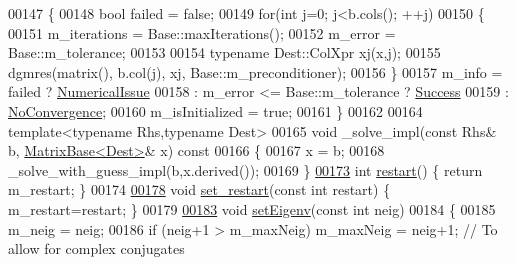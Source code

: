 \begin{DoxyCode}
00147 \textcolor{keyword}{  }\{    
00148     \textcolor{keywordtype}{bool} failed = \textcolor{keyword}{false};
00149     \textcolor{keywordflow}{for}(\textcolor{keywordtype}{int} j=0; j<b.cols(); ++j)
00150     \{
00151       m\_iterations = Base::maxIterations();
00152       m\_error = Base::m\_tolerance;
00153       
00154       \textcolor{keyword}{typename} Dest::ColXpr xj(x,j);
00155       dgmres(matrix(), b.col(j), xj, Base::m\_preconditioner);
00156     \}
00157     m\_info = failed ? \hyperlink{group__enums_gga85fad7b87587764e5cf6b513a9e0ee5eaaf9b736d310a664e7729d163a035cc5f}{NumericalIssue}
00158            : m\_error <= Base::m\_tolerance ? \hyperlink{group__enums_gga85fad7b87587764e5cf6b513a9e0ee5ea52581b035f4b59c203b8ff999ef5fcea}{Success}
00159            : \hyperlink{group__enums_gga85fad7b87587764e5cf6b513a9e0ee5eaba1c8763d1179778070f365ecc4157a8}{NoConvergence};
00160     m\_isInitialized = \textcolor{keyword}{true};
00161   \}
00162 
00164   \textcolor{keyword}{template}<\textcolor{keyword}{typename} Rhs,\textcolor{keyword}{typename} Dest>
00165   \textcolor{keywordtype}{void} \_solve\_impl(\textcolor{keyword}{const} Rhs& b, \hyperlink{group___core___module_class_eigen_1_1_matrix_base}{MatrixBase<Dest>}& x)\textcolor{keyword}{ const}
00166 \textcolor{keyword}{  }\{
00167     x = b;
00168     \_solve\_with\_guess\_impl(b,x.derived());
00169   \}
\hyperlink{class_eigen_1_1_d_g_m_r_e_s_a8017848f8ea8abc26f9524a05c0d2476}{00173}   \textcolor{keywordtype}{int} \hyperlink{class_eigen_1_1_d_g_m_r_e_s_a8017848f8ea8abc26f9524a05c0d2476}{restart}() \{ \textcolor{keywordflow}{return} m\_restart; \}
00174   
\hyperlink{class_eigen_1_1_d_g_m_r_e_s_a2f99e7b3b04da0ecb6607630a82b4e56}{00178}   \textcolor{keywordtype}{void} \hyperlink{class_eigen_1_1_d_g_m_r_e_s_a2f99e7b3b04da0ecb6607630a82b4e56}{set\_restart}(\textcolor{keyword}{const} \textcolor{keywordtype}{int} restart) \{ m\_restart=restart; \}
00179   
\hyperlink{class_eigen_1_1_d_g_m_r_e_s_a7510f3ded5959a8d98c3cd3aabebc84b}{00183}   \textcolor{keywordtype}{void} \hyperlink{class_eigen_1_1_d_g_m_r_e_s_a7510f3ded5959a8d98c3cd3aabebc84b}{setEigenv}(\textcolor{keyword}{const} \textcolor{keywordtype}{int} neig) 
00184   \{
00185     m\_neig = neig;
00186     \textcolor{keywordflow}{if} (neig+1 > m\_maxNeig) m\_maxNeig = neig+1; \textcolor{comment}{// To allow for complex conjugates}

\end{DoxyCode}
